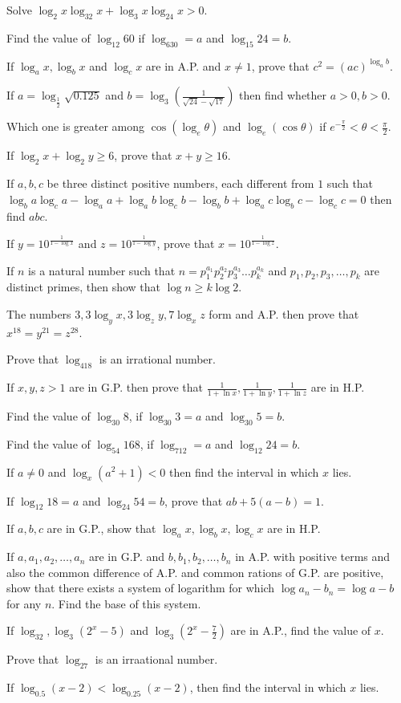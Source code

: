 \item Solve $\log_2x\log_32x + \log_3x\log_24x > 0$.
\item Find the value of $\log_{12}60$ if $\log_630 = a$ and $\log_{15}24 = b$.
\item If $\log_ax, \log_bx$ and $\log_cx$ are in A.P. and $x\neq 1$, prove that $c^2 = (ac)^{\log_ab}$.
\item If $a = \log_{\frac{1}{2}}\sqrt{0.125}$ and $b = \log_3\left(\frac{1}{\sqrt{24} - \sqrt{17}}\right)$ then find whether $a >0,
  b> 0$.
\item Which one is greater among $\cos(\log_e\theta)$ and $\log_e(\cos\theta)$ if $e^{-\frac{\pi}{2}} < \theta < \frac{\pi}{2}$.
\item If $\log_2x + \log_2y \geq 6$, prove that $x + y\geq 16$.
\item If $a,b,c$ be three distinct positive numbers, each different from $1$ such that $\log_ba\log_ca - \log_aa + \log_ab\log_cb
  - \log_bb + \log_ac\log_bc - \log_cc = 0$ then find $abc$.
\item If $y = 10^{\frac{1}{1 - \log x}}$ and $z = 10^{\frac{1}{1 - \log y}}$, prove that $x = 10^{\frac{1}{1 - \log z}}$.
\item If $n$ is a natural number such that $n = p_1^{a_1}p_2^{a_2}p_3^{a_3}\ldots p_k^{a_k}$ and $p_1, p_2, p_3, \ldots, p_k$ are
  distinct primes, then show that $\log n\geq k\log 2$.
\item The numbers $3, 3\log_yx, 3\log_zy, 7\log_xz$ form and A.P. then prove that $x^{18} = y^{21} = z^{28}$.
\item Prove that $\log_418$ is an irrational number.
\item If $x, y, z> 1$ are in G.P. then prove that $\frac{1}{1+ \ln x}, \frac{1}{1 + \ln y}, \frac{1}{1 + \ln z}$ are in H.P.
\item Find the value of $\log_{30}8$, if $\log_{30}3 = a$ and $\log_{30}5 = b$.
\item Find the value of $\log_{54}168$, if $\log_712 = a$ and $\log_{12}24 = b$.
\item If $a\neq 0$ and $\log_x(a^2 + 1) < 0$ then find the interval in which $x$ lies.
\item If $\log_{12}18 = a$ and $\log_{24}54=b$, prove that $ab + 5(a - b) = 1$.
\item If $a,b,c$ are in G.P., show that $\log_ax, \log_bx, \log_cx$ are in H.P.
\item If $a, a_1, a_2, \ldots, a_n$ are in G.P. and $b, b_1, b_2, \ldots, b_n$ in A.P. with positive terms and also the common
  difference of A.P. and common rations of G.P. are positive, show that there exists a system of logarithm for which $\log a_n -
  b_n = \log a - b$ for any $n$. Find the base of this system.
\item If $\log_32, \log_3(2^x - 5)$ and $\log_3\left(2^x - \frac{7}{2}\right)$ are in A.P., find the value of $x$.
\item Prove that $\log_27$ is an irraational number.
\item If $\log_{0.5}(x - 2) < \log_{0.25}(x - 2)$, then find the interval in which $x$ lies.
\stopitemize

